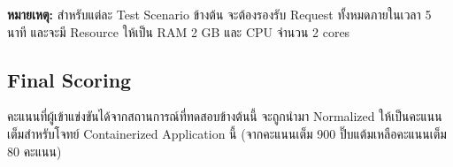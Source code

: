 \medskip
\textbf{หมายเหตุ:} สำหรับแต่ละ Test Scenario ข้างต้น จะต้องรองรับ Request ทั้งหมดภายในเวลา 5 นาที และจะมี Resource ให้เป็น RAM 2 GB และ CPU จำนวน 2 cores

\subsection{Final Scoring}

คะแนนที่ผู้เข้าแข่งขันได้จากสถานการณ์ที่ทดสอบข้างต้นนี้ จะถูกนำมา Normalized ให้เป็นคะแนนเต็มสำหรับโจทย์ Containerized Application นี้ (จากคะแนนเต็ม 900 ปิ๊บแต้มเหลือคะแนนเต็ม 80 คะแนน)
